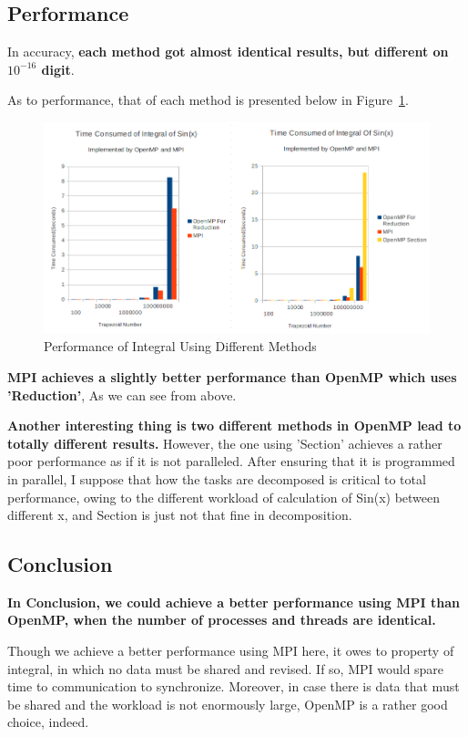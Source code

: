 \documentclass[a4paper]{article}   %
\begin{document}
\begin{CJK}{UTF8}{gbsn}
\begin{spacing}{1.2}
\subsection{Performance}
In accuracy, \textbf{each method got almost identical results, but different on $10^{-16}$ digit}.

As to performance, that of each method is presented below in Figure~\ref{fig:prob1_perf}.

\begin{figure}[htbp]
\centering
\includegraphics[width=12cm]{figs/prob1_Time.png}
\caption{Performance of Integral Using Different Methods}
\label{fig:prob1_perf}
\end{figure}
\textbf{MPI achieves a slightly better performance than OpenMP which uses 'Reduction'}, As we can see from above. 

\textbf{Another interesting thing is two different methods in OpenMP lead to totally different results.} However, the one using 'Section' achieves a rather poor performance as if it is not paralleled. After ensuring that it is programmed in parallel, I suppose that how the tasks are decomposed is critical to total performance, owing to the different workload of calculation of Sin(x) between different x, and Section is just not that fine in decomposition. 
\subsection{Conclusion}
\textbf{In Conclusion, we could achieve a better performance using MPI than OpenMP, when the number of processes and threads are identical.}

Though we achieve a better performance using MPI here, it owes to property of integral, in which no data must be shared and revised. If so, MPI would spare time to communication to synchronize. Moreover, in case there is data that must be shared and the workload is not enormously large, OpenMP is a rather good choice, indeed.


\end{spacing}
\end{CJK}
\end{document}
